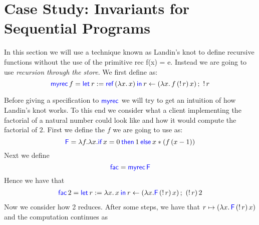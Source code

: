 \section{Case Study: Invariants for Sequential Programs}
\label{sec:case-study:sequential-invariants}

In this section we will use a technique known as Landin's knot to define recursive functions without the use of the primitive rec f(x) = e. Instead we are going to use \emph{recursion through the store}. We first define  as: 
\begin{displaymath}
{\langkw{myrec}} \, f = 
      \Let r = \Ref(\lambda x. \, x)  in
      r \gets \left( \lambda x.\, f \, (\deref{r}) \, x \right);\ \deref{r}
\end{displaymath}

Before giving a specification to $\textsf{\color{blue} myrec}$ we will try to get an intuition of how Landin's knot works.
To this end we consider what a client implementing the factorial of a natural number could look like and how it would compute the factorial of $2$.
First we define the $f$ we are going to use as:
\begin{displaymath}
{\langkw{F}} = 
     \lambda f. \lambda x. \If {x = 0} then 1 \Else x * \left( f \, (x-1)\right)
\end{displaymath}
Next we define
\begin{displaymath}
{\textsf{\color{blue} fac}} = \textsf{\color{blue} myrec} \, \textsf{\color{blue} F}
\end{displaymath}
Hence we have that
\begin{align*}
\langkw{fac} \, 2 = \Let r = \lambda x. \, x  in r \gets \left( \lambda x. \langkw{F}\, (\deref{r})\, x\right); \ (\deref{r})\, 2 
\end{align*}
Now we consider how  2 reduces. After some steps, we have that $r \mapsto \left(\lambda x.\, \textsf{\color{blue} F}\,  (\mathop{!}{r})\, x\right)$ and the computation continues as
